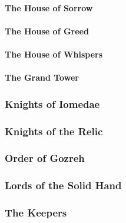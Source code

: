 			\paragraph{The House of Sorrow}
			\paragraph{The House of Greed}
			\paragraph{The House of Whispers}
			\paragraph{The Grand Tower}

		\subsubsection{Knights of Iomedae}

		\subsubsection{Knights of the Relic}

		\subsubsection{Order of Gozreh}

		\subsubsection{Lords of the Solid Hand}

		\subsubsection{The Keepers}

